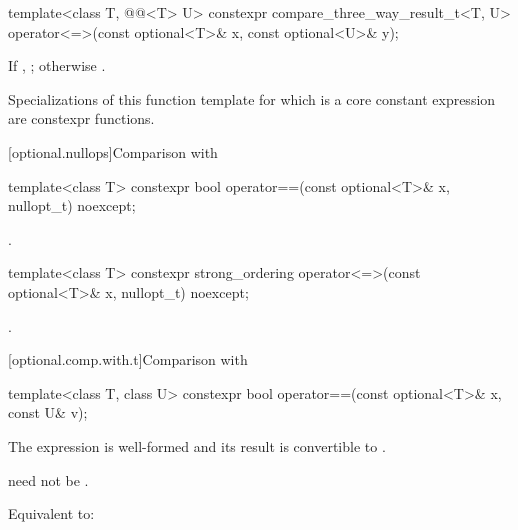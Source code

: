 %
\begin{itemdecl}
template<class T, @@<T> U>
  constexpr compare_three_way_result_t<T, U>
    operator<=>(const optional<T>& x, const optional<U>& y);
\end{itemdecl}

\begin{itemdescr}
\pnum
\returns
If , ; otherwise .

\pnum
\remarks
Specializations of this function template
for which  is a core constant expression
are constexpr functions.
\end{itemdescr}

[optional.nullops]{Comparison with }

%
\begin{itemdecl}
template<class T> constexpr bool operator==(const optional<T>& x, nullopt_t) noexcept;
\end{itemdecl}

\begin{itemdescr}
\pnum
\returns
{}.
\end{itemdescr}

%
\begin{itemdecl}
template<class T> constexpr strong_ordering operator<=>(const optional<T>& x, nullopt_t) noexcept;
\end{itemdecl}

\begin{itemdescr}
\pnum
\returns
{}.
\end{itemdescr}

[optional.comp.with.t]{Comparison with }

%
\begin{itemdecl}
template<class T, class U> constexpr bool operator==(const optional<T>& x, const U& v);
\end{itemdecl}

\begin{itemdescr}
\pnum
\mandates
The expression  is well-formed and
its result is convertible to .
\begin{note}
 need not be .
\end{note}

\pnum
\effects
Equivalent to: 
\end{itemdescr}

